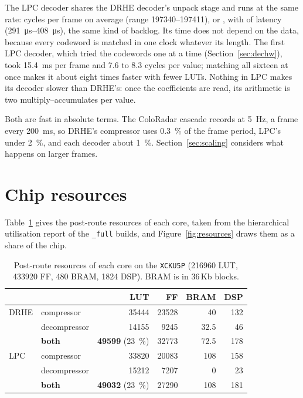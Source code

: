 The LPC decoder shares the DRHE decoder's unpack stage and runs at the same
rate: \lpcDecCycles{} cycles per frame on average (range
\numrange{197340}{197411}), or \lpcDecTime{}, with \lpcDecLat{} of latency
(\SIrange{291}{408}{\micro\second}), the same kind of backlog. Its time does not depend on the data,
because every codeword is matched in one clock whatever its length. The first
LPC decoder, which tried the codewords one at a time (Section~\ref{sec:dechw}),
took \SI{15.4}{\milli\second} per frame and 7.6 to 8.3 cycles per value;
matching all sixteen at once makes it about eight times faster with fewer
LUTs. Nothing in LPC makes its decoder slower than DRHE's: once the coefficients
are read, its arithmetic is two multiply--accumulates per value.

Both are fast in absolute terms. The ColoRadar cascade records at
\SI{5}{\hertz}, a frame every \SI{200}{\milli\second}, so DRHE's compressor uses
\SI{0.3}{\percent} of the frame period, LPC's under \SI{2}{\percent}, and each
decoder about \SI{1}{\percent}. Section~\ref{sec:scaling} considers what happens
on larger frames.

\section{Chip resources}
\label{sec:resources}

Table~\ref{tab:resources} gives the post-route resources of each core, taken
from the hierarchical utilisation report of the \texttt{\_full} builds, and
Figure~\ref{fig:resources} draws them as a share of the chip.

\begin{table}[htbp]
\centering
\caption[Resources per core]{Post-route resources of each core on the
\texttt{XCKU5P} (\num{216960} LUT, \num{433920} FF, 480 BRAM, \num{1824} DSP).
BRAM is in 36\,Kb blocks.}
\label{tab:resources}
\small
\begin{tabular}{@{}llrrrr@{}}
\toprule
& & LUT & FF & BRAM & DSP\\
\midrule
DRHE & compressor   & \num{35444} & \num{23528} & 40   & 132\\
     & decompressor & \num{14155} & \num{9245}  & 32.5 & 46\\
     & \textbf{both} & \textbf{\num{49599}} (\SI{23}{\percent}) & \num{32773} & 72.5 & 178\\
\midrule
LPC  & compressor   & \num{33820} & \num{20083} & 108  & 158\\
     & decompressor & \num{15212} & \num{7207}  & 0    & 23\\
     & \textbf{both} & \textbf{\num{49032}} (\SI{23}{\percent}) & \num{27290} & 108 & 181\\
\bottomrule
\end{tabular}
\end{table}

